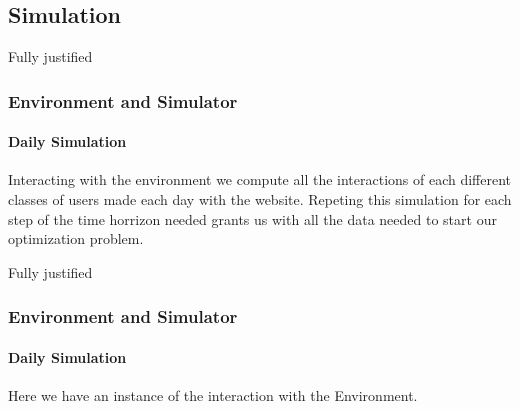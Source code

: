 \documentclass{beamer}
\begin{document}

\subsection{Simulation}

\begin {frame}{Fully justified}

\frametitle{Environment and Simulator}
\framesubtitle{Daily Simulation}

Interacting with the environment we compute all the interactions of each different classes of users made each day with the website.
Repeting this simulation for each step of the time horrizon needed grants us with all the data needed to start our optimization problem.

\end{frame}


\begin {frame} {Fully justified}

\frametitle{Environment and Simulator}
\framesubtitle{Daily Simulation}

Here we have an instance of the interaction with the Environment.



\end {frame}



\end{document}
